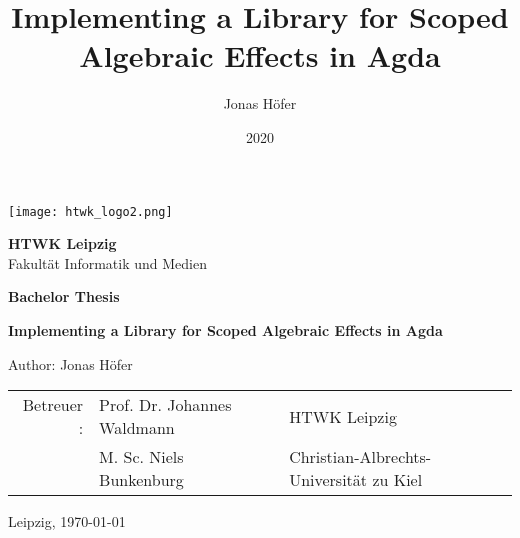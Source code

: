 \documentclass[10pt,a4paper,twoside,notitlepage]{report}
\title{Implementing a Library for Scoped Algebraic Effects in Agda}
\author{Jonas Höfer}
\date{2020}
\begin{document}
\begin{titlepage}
  \begin{large}
    \begin{center}

      \texttt{[image: htwk\_logo2.png]}

      \vskip 2cm

      \textbf{HTWK Leipzig}\\
      Fakultät Informatik und Medien\\

      \vskip 2cm

      \textbf{Bachelor Thesis}

      \vskip 2cm

    \textbf{Implementing a Library for Scoped Algebraic Effects in Agda}\\

      \vfill

      Author: Jonas Höfer\\

      \vskip 2cm

      \begin{tabular}{rll}
         Betreuer : & Prof. Dr. Johannes Waldmann & HTWK Leipzig\\
                    & M. Sc. Niels Bunkenburg     & Christian-Albrechts-Universität zu Kiel\\
      \end{tabular}

      \vskip 2cm

      Leipzig, \today\\

    \end{center}
  \end{large}
\end{titlepage}
\end{document}
